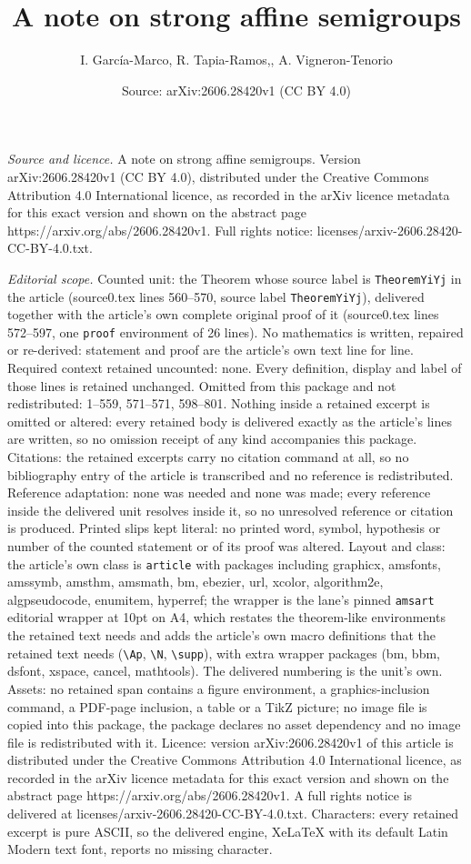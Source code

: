 \documentclass[10pt,a4paper]{amsart}
\title[A note on strong affine semigroups]{A note on strong affine semigroups}
\author{I. Garc\'ia-Marco, R. Tapia-Ramos,, A. Vigneron-Tenorio}
\date{Source: arXiv:2606.28420v1 (CC BY 4.0)}
\begin{document}
\maketitle

\noindent\emph{Source and licence.} A note on strong affine semigroups. Version arXiv:2606.28420v1 (CC BY 4.0), distributed under the Creative Commons Attribution 4.0 International licence, as recorded in the arXiv licence metadata for this exact version and shown on the abstract page https://arxiv.org/abs/2606.28420v1. Full rights notice: licenses/arxiv-2606.28420-CC-BY-4.0.txt.\par\smallskip

\noindent\textit{Editorial scope.} Counted unit: the Theorem whose source label is \texttt{TheoremYiYj} in the article (source0.tex lines 560--570, source label \texttt{TheoremYiYj}), delivered together with the article's own complete original proof of it (source0.tex lines 572--597, one \texttt{proof} environment of 26 lines). No mathematics is written, repaired or re-derived: statement and proof are the article's own text line for line. Required context retained uncounted: none. Every definition, display and label of those lines is retained unchanged. Omitted from this package and not redistributed: 1--559, 571--571, 598--801. Nothing inside a retained excerpt is omitted or altered: every retained body is delivered exactly as the article's lines are written, so no omission receipt of any kind accompanies this package. Citations: the retained excerpts carry no citation command at all, so no bibliography entry of the article is transcribed and no reference is redistributed. Reference adaptation: none was needed and none was made; every reference inside the delivered unit resolves inside it, so no unresolved reference or citation is produced. Printed slips kept literal: no printed word, symbol, hypothesis or number of the counted statement or of its proof was altered. Layout and class: the article's own class is \texttt{article} with packages including graphicx, amsfonts, amssymb, amsthm, amsmath, bm, ebezier, url, xcolor, algorithm2e, algpseudocode, enumitem, hyperref; the wrapper is the lane's pinned \texttt{amsart} editorial wrapper at 10pt on A4, which restates the theorem-like environments the retained text needs and adds the article's own macro definitions that the retained text needs (\texttt{\textbackslash Ap}, \texttt{\textbackslash N}, \texttt{\textbackslash supp}), with extra wrapper packages (bm, bbm, dsfont, xspace, cancel, mathtools). The delivered numbering is the unit's own. Assets: no retained span contains a figure environment, a graphics-inclusion command, a PDF-page inclusion, a table or a TikZ picture; no image file is copied into this package, the package declares no asset dependency and no image file is redistributed with it. Licence: version arXiv:2606.28420v1 of this article is distributed under the Creative Commons Attribution 4.0 International licence, as recorded in the arXiv licence metadata for this exact version and shown on the abstract page https://arxiv.org/abs/2606.28420v1. A full rights notice is delivered at licenses/arxiv-2606.28420-CC-BY-4.0.txt. Characters: every retained excerpt is pure ASCII, so the delivered engine, XeLaTeX with its default Latin Modern text font, reports no missing character.
\end{document}
